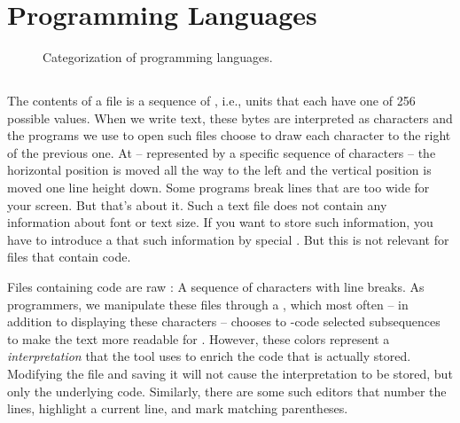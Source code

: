 \section{Programming Languages}
\label{sec:lang}

\begin{inspiration}{\cite{progLangJurassicPark}}
\end{inspiration}

\begin{figure}[tbp]
  
  \caption{Categorization of programming languages.}
  \label{fig:background:lang:categorization}
\end{figure}

\subsection{}

The contents of a file is a sequence of , i.e., units that each have one of 256 possible values. When we write text, these bytes are interpreted as characters and the programs we use to open such files choose to draw each character to the right of the previous one. At  -- represented by a specific sequence of characters -- the horizontal position is moved all the way to the left and the vertical position is moved one line height down. Some programs break lines that are too wide for your screen. But that's about it. Such a text file does not contain any information about font or text size. If you want to store such information, you have to introduce a  that  such information by special . But this is not relevant for files that contain code.

Files containing code are raw : A sequence of characters with line breaks. As programmers, we manipulate these files through a , which most often -- in addition to displaying these characters -- chooses to -code selected subsequences to make the text more readable for . However, these colors represent a \textsl{interpretation} that the tool uses to enrich the code that is actually stored. Modifying the file and saving it will not cause the interpretation to be stored, but only the underlying code. Similarly, there are some such editors that number the lines, highlight a current line, and mark matching parentheses.

